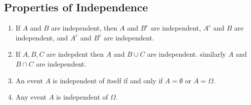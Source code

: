 \documentclass[openany]{report}
\begin{document}
\subsection{Properties of Independence}
\begin{enumerate}
    \item  If $A$ and $B$ are independent, then $A$ and $B^c$ are independent, $A^c$ and $B$ are independent, and $A^c$ and $B^c$ are independent.
    \item If $A,B,C$ are indepdent then $A$ and $B \cup C$ are independent. similarly $A$ and $B \cap C$ are independent.
    \item An event $A$ is independent of itself if and only if $A = \emptyset$ or $A = \Omega$.
    \item Any event $A$ is independent of $\Omega$.
\end{enumerate}
\end{document}
